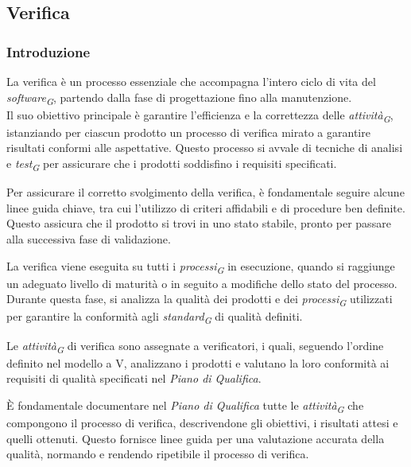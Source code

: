 \subsection{Verifica}
\label{subsec:verifica}

\subsubsection{Introduzione}
La verifica è un processo essenziale che accompagna l'intero ciclo di vita del \textit{software}\textsubscript{\textit{G}}, partendo dalla fase di progettazione fino alla manutenzione. \\
Il suo obiettivo principale è garantire l'efficienza e la correttezza delle \textit{attività}\textsubscript{\textit{G}}, istanziando per ciascun prodotto un processo di verifica mirato a garantire risultati conformi alle aspettative. Questo processo si avvale di tecniche di analisi e \textit{test}\textsubscript{\textit{G}} per assicurare che i prodotti soddisfino i requisiti specificati.

\vspace{0.2cm}

Per assicurare il corretto svolgimento della verifica, è fondamentale seguire alcune linee guida chiave, tra cui l'utilizzo di criteri affidabili e di procedure ben definite. Questo assicura che il prodotto si trovi in uno stato stabile, pronto per passare alla successiva fase di validazione.

\vspace{0.2cm}

La verifica viene eseguita su tutti i \textit{processi}\textsubscript{\textit{G}} in esecuzione, quando si raggiunge un adeguato livello di maturità o in seguito a modifiche dello stato del processo. Durante questa fase, si analizza la qualità dei prodotti e dei \textit{processi}\textsubscript{\textit{G}} utilizzati per garantire la conformità agli \textit{standard}\textsubscript{\textit{G}} di qualità definiti.

\vspace{0.2cm}

Le \textit{attività}\textsubscript{\textit{G}} di verifica sono assegnate a verificatori, i quali, seguendo l'ordine definito nel modello a V, analizzano i prodotti e valutano la loro conformità ai requisiti di qualità specificati nel \textit{Piano di Qualifica}.

\vspace{0.2cm}

È fondamentale documentare nel \textit{Piano di Qualifica} tutte le \textit{attività}\textsubscript{\textit{G}} che compongono il processo di verifica, descrivendone gli obiettivi, i risultati attesi e quelli ottenuti. Questo fornisce linee guida per una valutazione accurata della qualità, normando e rendendo ripetibile il processo di verifica.

